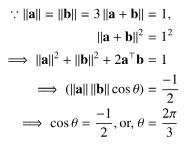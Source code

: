\begin{align}
	\because \left\lVert\mathbf{a}\right\rVert=\left\lVert\mathbf{b}\right\rVert  = 3 \left\lVert\mathbf{a}+\mathbf{b}\right\rVert&=1, \label{eq:12/10/5/17/2} \\
    \left\lVert\mathbf{a}+\mathbf{b}\right\rVert^2 & = 1^2 \\
    \implies \left\lVert\mathbf{a}\right\rVert^2 + \left\lVert\mathbf{b}\right\rVert^2 + 2\mathbf{a}^{\top}\mathbf{b} & = 1 \label{eq:12/10/5/17/3} \\
    \implies (\left\lVert\mathbf{a}\right\rVert\left\lVert\mathbf{b}\right\rVert\cos{\theta}) & = \frac{-1}{2} \label{eq:12/10/5/17/4} \\
	\implies \cos{\theta}  = \frac{-1}{2}, \text{or, }\theta&=\frac{2\pi}{3}
\end{align}

